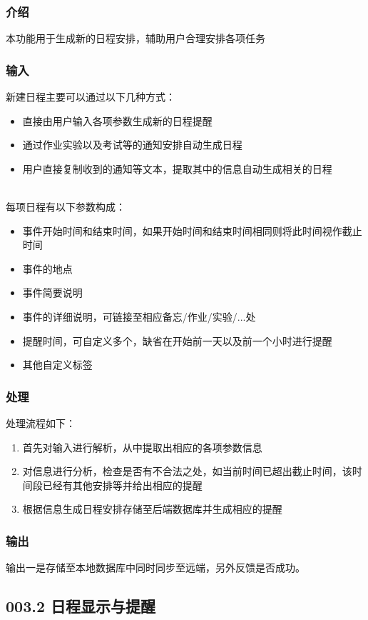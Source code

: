     \subsubsection{介绍}
    本功能用于生成新的日程安排，辅助用户合理安排各项任务
    \subsubsection{输入}
    新建日程主要可以通过以下几种方式：
    \begin{itemize}
      \item 直接由用户输入各项参数生成新的日程提醒
      \item 通过作业实验以及考试等的通知安排自动生成日程
      \item 用户直接复制收到的通知等文本，提取其中的信息自动生成相关的日程
    \end{itemize}\\
    每项日程有以下参数构成：
    \begin{itemize}
      \item 事件开始时间和结束时间，如果开始时间和结束时间相同则将此时间视作截止时间
      \item 事件的地点
      \item 事件简要说明
      \item 事件的详细说明，可链接至相应备忘/作业/实验/...处
      \item 提醒时间，可自定义多个，缺省在开始前一天以及前一个小时进行提醒
      \item 其他自定义标签
    \end{itemize}
    \subsubsection{处理}
    处理流程如下：
    \begin{enumerate}
      \item 首先对输入进行解析，从中提取出相应的各项参数信息
      \item 对信息进行分析，检查是否有不合法之处，如当前时间已超出截止时间，该时间段已经有其他安排等并给出相应的提醒
      \item 根据信息生成日程安排存储至后端数据库并生成相应的提醒
    \end{enumerate}
    \subsubsection{输出}
    输出一是存储至本地数据库中同时同步至远端，另外反馈是否成功。

  \subsection{003.2 日程显示与提醒}
